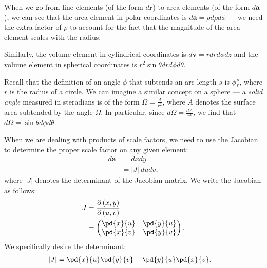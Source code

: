 \documentclass[10pt]{mypackage}
\begin{document}
When we go from line elements (of the form $d\mathbf{r}$) to area elements (of the form $d \mathbf{a}$), we can see that the area element in polar coordinates is $d \mathbf{a} = \rho d\rho d\phi$ --- we need the extra factor of $\rho$ to account for the fact that the magnitude of the area element scales with the radius.\newline

Similarly, the volume element in cylindrical coordinates is $d\mathbf{v} = r dr d\phi dz$ and the volume element in spherical coordinates is $r^2 \sin \theta dr d\phi d\theta$.\newline

Recall that the definition of an angle $\phi$ that subtends an arc length $s$ is $\phi \frac{s}{r}$, where $r$ is the radius of a circle. We can imagine a similar concept on a sphere --- a \textit{solid angle} measured in steradians is of the form $\Omega = \frac{A}{r^2}$, where $A$ denotes the surface area subtended by the angle $\Omega$. In particular, since $d\Omega = \frac{dA}{r^2}$, we find that $d\Omega = \sin\theta d\phi d\theta$.\newline

When we are dealing with products of scale factors, we need to use the Jacobian to determine the proper scale factor on any given element:
\begin{align*}
  d\mathbf{a} &= dx dy\\
              &= \left\vert J \right\vert \:du dv,
\end{align*}
where $|J|$ denotes the determinant of the Jacobian matrix. We write the Jacobian as follows:
\begin{align*}
  J &= \frac{\partial \left(x,y\right)}{\partial \left(u,v\right)}\\
    &= \begin{pmatrix}\pd{x}{u} & \pd{y}{u}\\ \pd{x}{v} & \pd{y}{v}\end{pmatrix}.
\end{align*}
We specifically desire the determinant:
\begin{align*}
  |J| &= \pd{x}{u}\pd{y}{v} - \pd{y}{u}\pd{x}{v}.
\end{align*}
\end{document}
